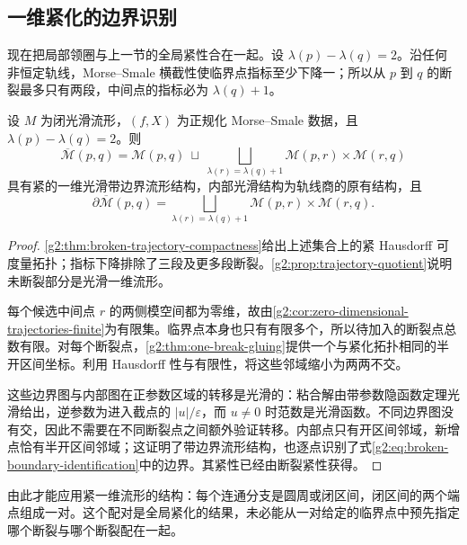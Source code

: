 \subsection{一维紧化的边界识别}
\label{g2:subsec:1803:04}

现在把局部领圈与上一节的全局紧性合在一起。设 \(\lambda(p)-\lambda(q)=2\)。沿任何非恒定轨线，Morse--Smale 横截性使临界点指标至少下降一；所以从 \(p\) 到 \(q\) 的断裂最多只有两段，中间点的指标必为 \(\lambda(q)+1\)。

\begin{theorem}\label{g2:thm:one-dimensional-compactification}
	设 \(M\) 为闭光滑流形，\((f,X)\) 为正规化 Morse--Smale 数据，且 \(\lambda(p)-\lambda(q)=2\)。则
	\[
		\overline{\mathcal M}(p,q)
		=
		\mathcal M(p,q)\ \sqcup\
		\bigsqcup_{\lambda(r)=\lambda(q)+1}
		\mathcal M(p,r)\times\mathcal M(r,q)
	\]
	具有紧的一维光滑带边界流形结构，内部光滑结构为轨线商的原有结构，且
	\begin{equation}\label{g2:eq:broken-boundary-identification}
		\partial\overline{\mathcal M}(p,q)
		=
		\bigsqcup_{\lambda(r)=\lambda(q)+1}
		\mathcal M(p,r)\times\mathcal M(r,q).
	\end{equation}
\end{theorem}
\begin{proof}
	\cref{g2:thm:broken-trajectory-compactness}给出上述集合上的紧 Hausdorff 可度量拓扑；指标下降排除了三段及更多段断裂。\cref{g2:prop:trajectory-quotient}说明未断裂部分是光滑一维流形。

	每个候选中间点 \(r\) 的两侧模空间都为零维，故由\cref{g2:cor:zero-dimensional-trajectories-finite}为有限集。临界点本身也只有有限多个，所以待加入的断裂点总数有限。对每个断裂点，\cref{g2:thm:one-break-gluing}提供一个与紧化拓扑相同的半开区间坐标。利用 Hausdorff 性与有限性，将这些邻域缩小为两两不交。

	这些边界图与内部图在正参数区域的转移是光滑的：粘合解由带参数隐函数定理光滑给出，逆参数为进入截点的 \(|u|/\varepsilon\)，而 \(u\ne0\) 时范数是光滑函数。不同边界图没有交，因此不需要在不同断裂点之间额外验证转移。内部点只有开区间邻域，新增点恰有半开区间邻域；这证明了带边界流形结构，也逐点识别了式\eqref{g2:eq:broken-boundary-identification}中的边界。其紧性已经由断裂紧性获得。
\end{proof}

由此才能应用紧一维流形的结构：每个连通分支是圆周或闭区间，闭区间的两个端点组成一对。这个配对是全局紧化的结果，未必能从一对给定的临界点中预先指定哪个断裂与哪个断裂配在一起。

